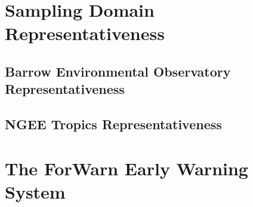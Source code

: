\documentclass{beamer}
\begin{document}

\section[Representativeness]{Sampling Domain Representativeness}

\subsection[Barrow]{Barrow Environmental Observatory Representativeness}

\subsection[NGEE Tropics]{NGEE Tropics Representativeness}


\section[ForWarn]{The ForWarn Early Warning System}

\end{document}
